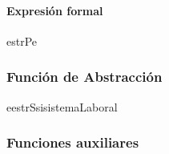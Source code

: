 \paragraph{Expresión formal \\}
\begin{RepFormal}{estrP}{e}
\end{RepFormal}

\subsubsection{Funci\'on de Abstracci\'on}

\begin{FunAbsDescriptiva}{e}{estrS}{si}{sistemaLaboral}



\end{FunAbsDescriptiva}

\subsubsection{Funciones auxiliares}
